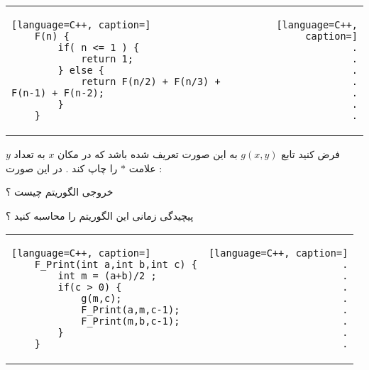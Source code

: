 \documentclass[12pt]{article}
\begin{document}
\begin{latin}
\begin{center}
  \bgroup
  \def\arraystretch{1.5}%
  \begin{tabular}{ I  D  }
	\begin{lstlisting}[language=C++, caption=]
	F(n) {
		if( n <= 1 ) {
			return 1;
		} else {
			return F(n/2) + F(n/3) + F(n-1) + F(n-2);
		}
	}
	\end{lstlisting}
     &  
	\begin{lstlisting}[language=C++, caption=]
	.
	.
	.
	.
	.
	.
	.
	\end{lstlisting}
  \end{tabular}
  \egroup
\end{center}
\end{latin}






\newpage


\noindent
فرض کنید تابع 
$g(x,y)$
به این صورت تعریف شده باشد که در مکان
$x$
به تعداد
$y$
علامت 
$*$
را چاپ کند . در این صورت :


\noindent
خروجی الگوریتم
چیست ؟

\noindent
پیچیدگی زمانی این الگوریتم را محاسبه کنید ؟


\begin{latin}
\begin{center}
  \bgroup
  \def\arraystretch{1.5}%
  \begin{tabular}{ E  D  }
	\begin{lstlisting}[language=C++, caption=]
	F_Print(int a,int b,int c) {
		int m = (a+b)/2 ;
		if(c > 0) {
			g(m,c);
			F_Print(a,m,c-1);
			F_Print(m,b,c-1);
		}
	}
	\end{lstlisting}
     &  
	\begin{lstlisting}[language=C++, caption=]
	.
	.
	.
	.
	.
	.
	.
	.
	\end{lstlisting}
  \end{tabular}
  \egroup
\end{center}
\end{latin}
\end{document}
